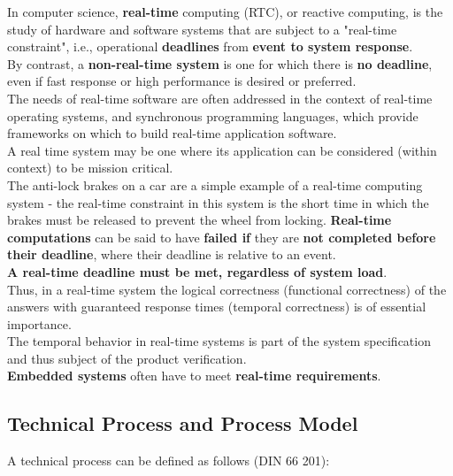 In computer science, \textbf{real-time} computing (RTC), or reactive computing, is the study of hardware and software systems that are subject to a "real-time constraint", i.e., operational \textbf{deadlines} from \textbf{event to system response}. \\

By contrast, a \textbf{non-real-time system}  is one for which there is \textbf{no deadline}, even if fast response or high performance is desired or preferred. \\

The needs of real-time software are often addressed in the context of real-time operating systems, and synchronous programming languages, which provide frameworks on which to build real-time application software.\\

A real time system may be one where its application can be considered (within context) to be mission critical. \\

The anti-lock brakes on a car are a simple example of a real-time computing system - the real-time constraint in this system is the short time in which the brakes must be released to prevent the wheel from locking. \textbf{Real-time computations} can be said to have \textbf{failed if} they are \textbf{not completed before their deadline}, where their deadline is relative to an event. \\

\textbf{A real-time deadline must be met, regardless of system load}.\\

Thus, in a real-time system the logical correctness (functional correctness) of the answers with guaranteed response times (temporal correctness) is of essential importance. \\

The temporal behavior in real-time systems is part of the system specification and thus subject of the product verification.\\

\textbf{Embedded systems} often have to meet \textbf{real-time requirements}.

\subsection{Technical Process and Process Model}

A technical process can be defined as follows (DIN 66 201):


